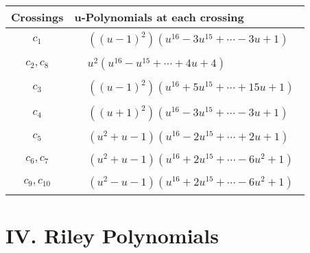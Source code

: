 \documentclass[1p]{elsarticle_modified}
\theoremstyle{definition}
\begin{document}
\begin{tabular}{m{50pt}|m{274pt}}
Crossings & \hspace{64pt}u-Polynomials at each crossing \\
\hline $$\begin{aligned}c_{1}\end{aligned}$$&$\begin{aligned}
&((u-1)^2)(u^{16}-3 u^{15}+\cdots-3 u+1)
\end{aligned}$\\
\hline $$\begin{aligned}c_{2},c_{8}\end{aligned}$$&$\begin{aligned}
&u^2(u^{16}- u^{15}+\cdots+4 u+4)
\end{aligned}$\\
\hline $$\begin{aligned}c_{3}\end{aligned}$$&$\begin{aligned}
&((u-1)^2)(u^{16}+5 u^{15}+\cdots+15 u+1)
\end{aligned}$\\
\hline $$\begin{aligned}c_{4}\end{aligned}$$&$\begin{aligned}
&((u+1)^2)(u^{16}-3 u^{15}+\cdots-3 u+1)
\end{aligned}$\\
\hline $$\begin{aligned}c_{5}\end{aligned}$$&$\begin{aligned}
&(u^2+u-1)(u^{16}-2 u^{15}+\cdots+2 u+1)
\end{aligned}$\\
\hline $$\begin{aligned}c_{6},c_{7}\end{aligned}$$&$\begin{aligned}
&(u^2+u-1)(u^{16}+2 u^{15}+\cdots-6 u^2+1)
\end{aligned}$\\
\hline $$\begin{aligned}c_{9},c_{10}\end{aligned}$$&$\begin{aligned}
&(u^2- u-1)(u^{16}+2 u^{15}+\cdots-6 u^2+1)
\end{aligned}$\\
\hline
\end{tabular}\newpage\renewcommand{\arraystretch}{1}
\centering \section*{ IV. Riley Polynomials}
\end{document}
